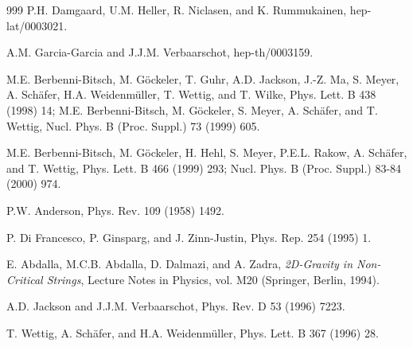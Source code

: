 \begin{thebibliography}{999}
       P.H. Damgaard, U.M. Heller, R. Niclasen, and
                      K. Rummukainen,
                      hep-lat/0003021.

      A.M. Garcia-Garcia and J.J.M. Verbaarschot,
                      hep-th/0003159.

     M.E. Berbenni-Bitsch, M. G\"ockeler, T. Guhr,
                      A.D. Jackson, J.-Z. Ma, S. Meyer, A. Sch\"afer,
                      H.A. Weidenm\"uller, T. Wettig, and T. Wilke,
                      Phys. Lett. B 438 (1998) 14;             %
                      M.E. Berbenni-Bitsch, M. G\"ockeler, S. Meyer,
                      A. Sch\"afer, and T. Wettig,
                      Nucl. Phys. B (Proc. Suppl.) 73 (1999) 605.   %

                      M.E. Berbenni-Bitsch, M. G\"ockeler, H. Hehl, 
                      S. Meyer, P.E.L. Rakow, A. Sch\"afer, and T. Wettig,
                      Phys. Lett. B 466 (1999) 293;                 %
                      Nucl. Phys. B (Proc. Suppl.) 83-84 (2000) 974.

      P.W. Anderson, 
                      Phys. Rev. 109 (1958) 1492.               %

    P. Di Francesco, P. Ginsparg, and J. Zinn-Justin, 
                      Phys. Rep. 254 (1995) 1.                  %

     E. Abdalla, M.C.B. Abdalla, D. Dalmazi, and A. Zadra,
                      {\it 2D-Gravity in Non-Critical Strings}, Lecture
                      Notes in Physics, vol. M20
                      (Springer, Berlin, 1994).

          A.D. Jackson and J.J.M. Verbaarschot,
                      Phys. Rev. D 53 (1996) 7223.              %

       T. Wettig, A. Sch\"afer, and H.A. Weidenm\"uller,
                      Phys. Lett. B 367 (1996) 28.               %


\end{thebibliography}
